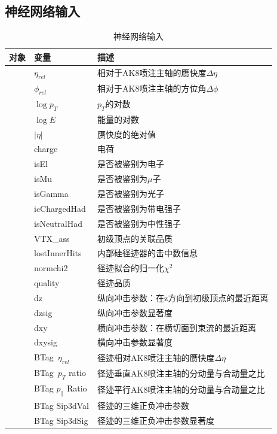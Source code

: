 \subsection{神经网络输入}
\begin{table}[htbp]
    \caption{神经网络输入}
    \centering
    \begin{tabular}{>{\centering\arraybackslash}p{2.5cm}%
    >{\centering\arraybackslash}p{3cm}%
    >{\centering\arraybackslash}p{9cm}}
    \toprule\toprule
    \textbf{对象} & \textbf{变量} & \textbf{描述}\\
    \midrule
    \multirow{25}{*}{粒子候选者} & $\eta_{rel}$ & 相对于AK8喷注主轴的赝快度$\Delta \eta$\\
    & $\phi_{rel}$ & 相对于AK8喷注主轴的方位角$\Delta \phi$\\
    & $\log{p_T}$ & $p_T$的对数\\
    & $\log{E}$ & 能量的对数\\
    & $|\eta|$ & 赝快度的绝对值\\
    & charge & 电荷\\
    & isEl & 是否被鉴别为电子\\
    & isMu & 是否被鉴别为$\mu$子\\
    & isGamma & 是否被鉴别为光子\\
    & icChargedHad & 是否被鉴别为带电强子\\
    & isNeutralHad & 是否被鉴别为中性强子\\
    & VTX\_ass & 初级顶点的关联品质\\
    & lostInnerHits & 内部硅径迹器的击中数信息\\
    & normchi2 & 径迹拟合的归一化$\chi^2$\\
    & quality & 径迹品质\\
    & dz & 纵向冲击参数：在z方向到初级顶点的最近距离\\
    & dzsig & 纵向冲击参数显著度\\
    & dxy & 横向冲击参数：在横切面到束流的最近距离\\
    & dxysig & 横向冲击参数显著度\\
    & BTag\ $\eta_{rel}$ & 径迹相对AK8喷注主轴的赝快度$\Delta \eta$\\
    & BTag\ $p_T$ ratio & 径迹垂直AK8喷注主轴的分动量与合动量之比\\
    & BTag $p_{\parallel}$ Ratio & 径迹平行AK8喷注主轴的分动量与合动量之比\\
    & BTag Sip3dVal & 径迹的三维正负冲击参数\\
    & BTag Sip3dSig & 径迹的三维正负冲击参数显著度\\

\end{tabular}
\end{table}
